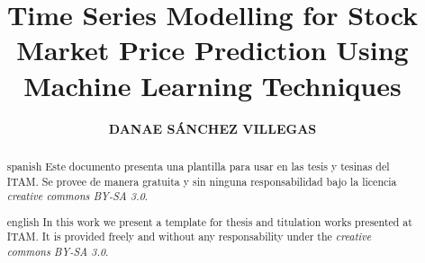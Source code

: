 \documentclass{tesisITAM}
\title{Time Series Modelling for Stock Market Price Prediction Using Machine Learning Techniques}
\author{\textbf{DANAE SÁNCHEZ VILLEGAS}}
\begin{document}
	\maketitle
	\publicationrights


	\begin{abstract}{spanish}
		Este documento presenta una plantilla para usar en las tesis y tesinas del ITAM. Se provee de manera gratuita y sin ninguna responsabilidad bajo la licencia \emph{creative commons BY-SA 3.0}.
	\end{abstract}

	\begin{abstract}{english}
		In this work we present a template for thesis and titulation works presented at ITAM. It is provided freely and without any responsability under the \emph{creative commons BY-SA 3.0}. 
	\end{abstract}


	\setcounter{page}{1}

	\tableofcontents
	\listoffigures
	\listoftables
	\newpage

	\setcounter{page}{1}

	 
	
    
    
    
    



 

	\appendix

	\clearpage
	

	
	 
\end{document}
